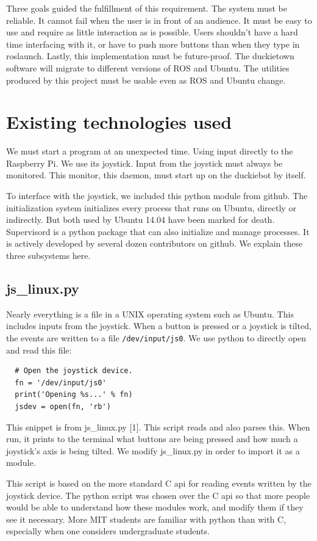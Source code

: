 \documentclass[titlepage]{article}
\begin{document}
Three goals guided the fulfillment of this requirement. The system must be reliable. It cannot fail when the user is in front of an audience. It must be easy to use and require as little interaction as is possible. Users shouldn't have a hard time interfacing with it, or have to push more buttons than when they type in roslaunch.
Lastly, this implementation must be future-proof. The duckietown software will migrate to  different versions of ROS and Ubuntu. The utilities produced by this project must be usable even as ROS and Ubuntu change. 
\section{Existing technologies used} 
We must start a program at an unexpected time. Using input directly to the Raspberry Pi. We use its joystick. Input from the joystick must always be monitored. This monitor, this daemon, must start up on the duckiebot by itself. 

To interface with the joystick, we included this python module from github. 
The initialization system initializes every process that runs on Ubuntu, directly or indirectly. But both used by Ubuntu 14.04 have been marked for death.
Supervisord is a python package that can also initialize and manage processes. It is actively developed by several dozen contributors on github.
We explain these three subsystems here. 
\subsection{js\_linux.py}
Nearly everything is a file in a UNIX operating system such as Ubuntu. This includes inputs from the joystick. When a button is pressed or a joystick is tilted, the events are written to a file \texttt{/dev/input/js0}. We use python to directly open and read this file:

\begin{lstlisting}
  # Open the joystick device.
  fn = '/dev/input/js0' 
  print('Opening %s...' % fn)
  jsdev = open(fn, 'rb')
\end{lstlisting}

This snippet is from js\_linux.py [1]. This script reads and also parses this. When run, it prints to the terminal what buttons are being pressed and how much a joystick's axis is being tilted. We modify js\_linux.py in order to import it as a module. 

This script is based on the more standard C api for reading events written by the joystick device. The python script was chosen over the C api so that more people would be able to understand how these modules work, and modify them if they see it necessary. More MIT students are familiar with python than with C, especially when one considers undergraduate students.
\end{document}
